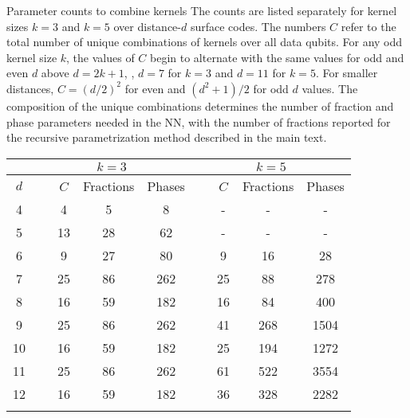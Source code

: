 \begin{table}[htbp]
\centering
\ccaption
{Parameter counts to combine kernels}
{
The counts are listed separately for kernel sizes $k=3$ and $k=5$ over distance-$d$ surface codes.
The numbers $C$ refer to the total number of unique combinations of kernels over all data qubits.
For any odd kernel size $k$, the values of $C$ begin to alternate with the same values for odd and even $d$ above $d=2k+1$, \ie, $d=7$ for $k=3$ and $d=11$ for $k=5$.
For smaller distances, $C=(d/2)^2$ for even and $(d^2+1)/2$ for odd $d$ values.
The composition of the unique combinations determines the number of fraction and phase parameters needed in the NN,
with the number of fractions reported for the recursive parametrization method described in the main text.
}
\renewcommand{\arraystretch}{1.25}
\begin{tabular}{c ccc ccc}
\hline
      & \multicolumn{3}{c}{$k=3$}   & \multicolumn{3}{c}{$k=5$} \\
\hline
$d$ & ~~~$C$ & Fractions & Phases & ~~~$C$ & Fractions & Phases \\
\hline
4 & ~~~4 & 5 & 8 & ~~~- & - & - \\
5 & ~~~13 & 28 & 62 & ~~~- & - & - \\
6 & ~~~9 & 27 & 80 & ~~~9 & 16 & 28 \\
7 & ~~~25 & 86 & 262 & ~~~25 & 88 & 278 \\
8 & ~~~16 & 59 & 182 & ~~~16 & 84 & 400 \\
9 & ~~~25 & 86 & 262 & ~~~41 & 268 & 1504 \\
10 & ~~~16 & 59 & 182 & ~~~25 & 194 & 1272 \\
11 & ~~~25 & 86 & 262 & ~~~61 & 522 & 3554 \\
12 & ~~~16 & 59 & 182 & ~~~36 & 328 & 2282 \\
\hline
\label{table:unique-kern-contribs}
\end{tabular}
\end{table}


